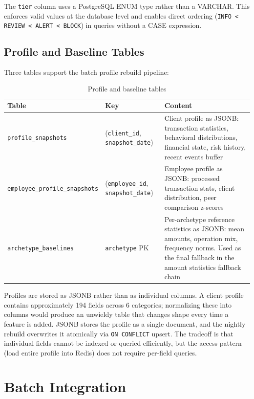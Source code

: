 The \texttt{tier} column uses a PostgreSQL ENUM type rather than a VARCHAR.
This enforces valid values at the database level and enables direct ordering
(\texttt{INFO < REVIEW < ALERT < BLOCK}) in queries without a CASE expression.

\subsection{Profile and Baseline Tables}

Three tables support the batch profile rebuild pipeline:

\begin{table}[H]
\centering
\caption{Profile and baseline tables}
\label{tab:profile-tables}
\begin{tabularx}{\textwidth}{@{}llX@{}}
\toprule
\textbf{Table} & \textbf{Key} & \textbf{Content} \\
\midrule
\texttt{profile\_snapshots}          & (\texttt{client\_id}, \texttt{snapshot\_date})
    & Client profile as JSONB: transaction statistics, behavioral distributions,
      financial state, risk history, recent events buffer \\
\addlinespace
\texttt{employee\_profile\_snapshots} & (\texttt{employee\_id}, \texttt{snapshot\_date})
    & Employee profile as JSONB: processed transaction stats, client distribution,
      peer comparison z-scores \\
\addlinespace
\texttt{archetype\_baselines}        & \texttt{archetype} PK
    & Per-archetype reference statistics as JSONB: mean amounts, operation mix,
      frequency norms. Used as the final fallback in the amount statistics
      fallback chain \\
\bottomrule
\end{tabularx}
\end{table}

Profiles are stored as JSONB rather than as individual columns. A client
profile contains approximately 194 fields across 6 categories; normalizing
these into columns would produce an unwieldy table that changes shape every
time a feature is added. JSONB stores the profile as a single document,
and the nightly rebuild overwrites it atomically via \texttt{ON CONFLICT}
upsert. The tradeoff is that individual fields cannot be indexed or queried
efficiently, but the access pattern (load entire profile into Redis) does not
require per-field queries.

\section{Batch Integration}
\label{sec:batch-integration}

